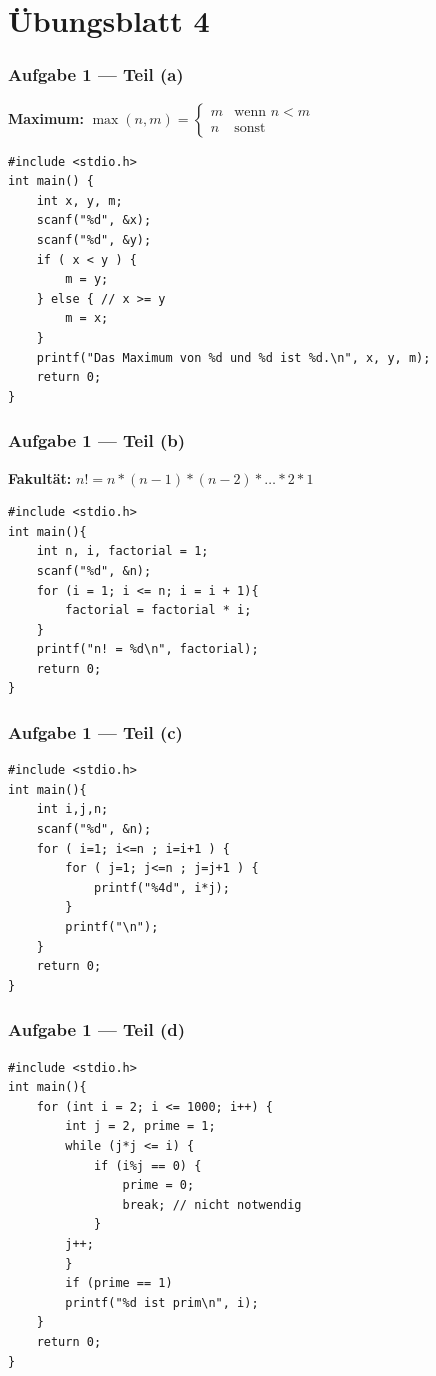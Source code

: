 \documentclass{beamer}
\newcommand*{\ttfamilywithbold}{\fontfamily{lmtt}\selectfont}
\begin{document}

\section{Übungsblatt 4}

\begin{frame}[fragile] \frametitle{Aufgabe 1 --- Teil (a)}
	\textbf{Maximum:} $\displaystyle \max(n,m) = \begin{cases}
		m & \text{wenn } n < m \\
		n & \text{sonst}
	\end{cases}$ \pause
	
	\vspace{\baselineskip}
	
	\begin{lstlisting}[style=frame, basicstyle=\ttfamilywithbold\footnotesize]
#include <stdio.h>
int main() {
	int x, y, m;
	scanf("%d", &x);
	scanf("%d", &y);
	if ( x < y ) {
		m = y;
	} else { // x >= y
		m = x;
	}
	printf("Das Maximum von %d und %d ist %d.\n", x, y, m);
	return 0;
}
	\end{lstlisting}
\end{frame}

\begin{frame}[fragile] \frametitle{Aufgabe 1 --- Teil (b)}
	\textbf{Fakultät:} $\displaystyle n! = n * (n-1) * (n-2) * \dots * 2 * 1$ \pause
	
\begin{lstlisting}[style=frame]
#include <stdio.h>
int main(){
	int n, i, factorial = 1;
	scanf("%d", &n);
	for (i = 1; i <= n; i = i + 1){
		factorial = factorial * i;
	}
	printf("n! = %d\n", factorial);
	return 0;
}
\end{lstlisting}
\end{frame}

\begin{frame}[fragile] \frametitle{Aufgabe 1 --- Teil (c)}
	\pause
	
	\begin{lstlisting}[style=frame]
#include <stdio.h>
int main(){
	int i,j,n;
	scanf("%d", &n);
	for ( i=1; i<=n ; i=i+1 ) {
		for ( j=1; j<=n ; j=j+1 ) {
			printf("%4d", i*j);
		}
		printf("\n");
	}
	return 0;
}
	\end{lstlisting}
\end{frame}


\begin{frame}[fragile] \frametitle{Aufgabe 1 --- Teil (d)}
	\pause
	
	\begin{lstlisting}[style=frame, basicstyle=\ttfamilywithbold\footnotesize]
#include <stdio.h>
int main(){
	for (int i = 2; i <= 1000; i++) {
		int j = 2, prime = 1;
		while (j*j <= i) {
			if (i%j == 0) {
				prime = 0;
				break; // nicht notwendig
			}
		j++;
		}
		if (prime == 1)
		printf("%d ist prim\n", i);
	}
	return 0;
}
	\end{lstlisting}
\end{frame}
\end{document}
